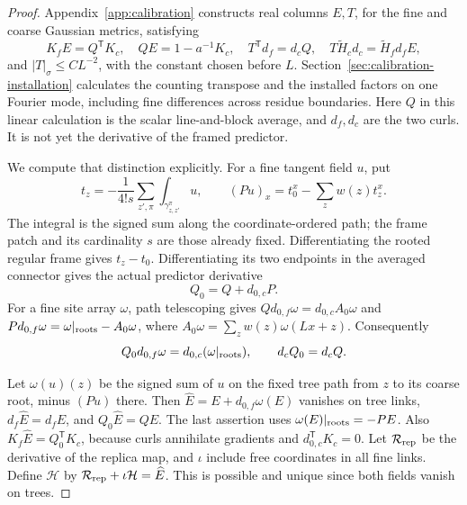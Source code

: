 \documentclass[11pt,reqno]{amsart}
\numberwithin{equation}{section}
\theoremstyle{definition}
\theoremstyle{remark}
\begin{document}
\begin{proof}
Appendix~\ref{app:calibration} constructs real columns \(E,T\),
for the fine and coarse Gaussian metrics, satisfying
\begin{equation}
 K_fE=Q^{\mathsf T}K_c,\quad QE=1-a^{-1}K_c,\quad
 T^{\mathsf T}d_f=d_cQ,\quad
 T\widetilde H_cd_c=\widetilde H_fd_fE,
 \label{eq:calibrated-installed-columns}
\end{equation}
and \(|T|_\sigma\le CL^{-2}\), with the constant chosen before
\(L\). Section~\ref{sec:calibration-installation} calculates
the counting transpose and the installed factors on one Fourier
mode, including fine differences across residue boundaries.
Here \(Q\) in this linear calculation is the scalar
line-and-block average, and \(d_f,d_c\) are the two curls.
It is not yet the derivative of the framed predictor.

We compute that distinction explicitly. For a fine tangent field
\(u\), put
\[
 t_z=-\frac1{4!s}\sum_{z',\pi}
                          \int_{\gamma_{z,z'}^\pi}u,
 \qquad (Pu)_x=t_0^x-\sum_z w(z)t_z^x.
\]
The integral is the signed sum along the coordinate-ordered path;
the frame patch and its cardinality \(s\) are those already fixed.
Differentiating the rooted regular frame gives \(t_z-t_0\).
Differentiating its two endpoints in the averaged connector gives
the actual predictor derivative
\[
                         Q_0=Q+d_{0,c}P.
\]
For a fine site array \(\omega\), path telescoping gives
\(Qd_{0,f}\omega=d_{0,c}A_0\omega\) and
\(Pd_{0,f}\omega=\omega|_{\rm roots}-A_0\omega\), where
\(A_0\omega=\sum_z w(z)\omega(Lx+z)\).
Consequently
\begin{equation}
 Q_0d_{0,f}\omega=d_{0,c}(\omega|_{\rm roots}),
                         \qquad d_cQ_0=d_cQ.
 \label{eq:calibrated-frame-correction}
\end{equation}

Let \(\omega(u)(z)\) be the signed sum of \(u\) on the fixed
tree path from \(z\) to its coarse root, minus \((Pu)\) there.
Then \(\widehat E=E+d_{0,f}\omega(E)\) vanishes on tree links,
\(d_f\widehat E=d_fE\), and
\(Q_0\widehat E=QE\). The last assertion uses
\(\omega(E)|_{\rm roots}=-PE\).
Also \(K_f\widehat E=Q_0^{\mathsf T}K_c\), because curls annihilate
gradients and \(d_{0,c}^{\mathsf T}K_c=0\).
Let \(\mathcal R_{\rm rep}\) be the derivative of the replica
map, and \(\iota\) include free coordinates in all fine links.
Define \(\mathcal H\) by
\(\mathcal R_{\rm rep}+\iota\mathcal H=\widehat E\).
This is possible and unique since both fields vanish on trees.


\end{proof}
\end{document}
